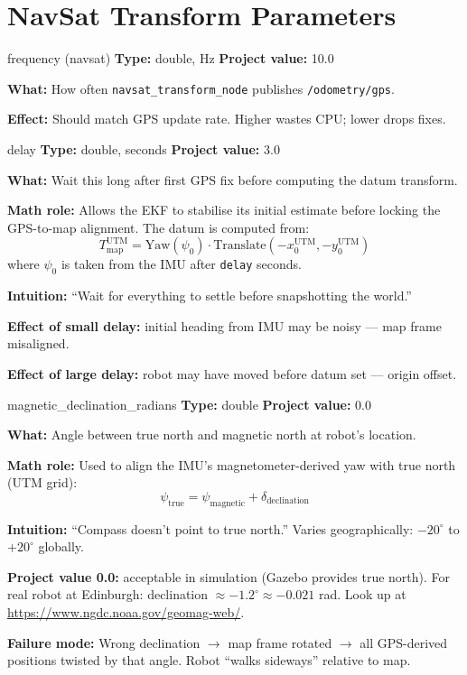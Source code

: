 \documentclass[11pt,a4paper]{article}
\begin{document}
\section{NavSat Transform Parameters}

\begin{paramcard}{frequency (navsat)}
\textbf{Type:} double, Hz \quad \textbf{Project value:} 10.0

\textbf{What:} How often \texttt{navsat\_transform\_node} publishes \texttt{/odometry/gps}.

\textbf{Effect:} Should match GPS update rate. Higher wastes CPU; lower drops fixes.
\end{paramcard}

\begin{paramcard}{delay}
\textbf{Type:} double, seconds \quad \textbf{Project value:} 3.0

\textbf{What:} Wait this long after first GPS fix before computing the datum transform.

\textbf{Math role:} Allows the EKF to stabilise its initial estimate before locking the GPS-to-map alignment. The datum is computed from:
\[
T_{\text{map}}^{\text{UTM}} = \text{Yaw}(\psi_0) \cdot \text{Translate}(-x_0^{\text{UTM}}, -y_0^{\text{UTM}})
\]
where $\psi_0$ is taken from the IMU after \texttt{delay} seconds.

\textbf{Intuition:} ``Wait for everything to settle before snapshotting the world.''

\textbf{Effect of small delay:} initial heading from IMU may be noisy --- map frame misaligned.

\textbf{Effect of large delay:} robot may have moved before datum set --- origin offset.
\end{paramcard}

\begin{paramcard}{magnetic\_declination\_radians}
\textbf{Type:} double \quad \textbf{Project value:} 0.0

\textbf{What:} Angle between true north and magnetic north at robot's location.

\textbf{Math role:} Used to align the IMU's magnetometer-derived yaw with true north (UTM grid):
\[
\psi_{\text{true}} = \psi_{\text{magnetic}} + \delta_{\text{declination}}
\]

\textbf{Intuition:} ``Compass doesn't point to true north.'' Varies geographically: $-20^\circ$ to $+20^\circ$ globally.

\textbf{Project value 0.0:} acceptable in simulation (Gazebo provides true north). For real robot at Edinburgh: declination $\approx -1.2^\circ \approx -0.021$ rad. Look up at \url{https://www.ngdc.noaa.gov/geomag-web/}.

\textbf{Failure mode:} Wrong declination $\to$ map frame rotated $\to$ all GPS-derived positions twisted by that angle. Robot ``walks sideways'' relative to map.
\end{paramcard}
\end{document}
